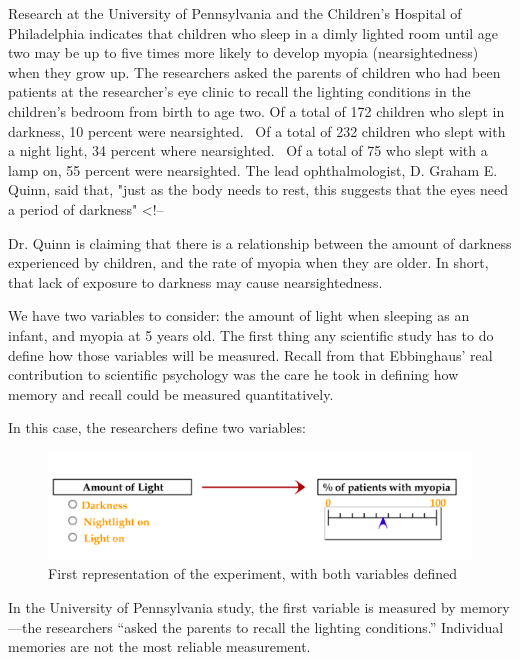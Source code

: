 \begin{refsection}
\begin{apatextbox}
Research at the University of Pennsylvania and the Children's Hospital of Philadelphia indicates that children who sleep in a dimly lighted room until age two may be up to five times more likely to develop myopia (nearsightedness) when they grow up.\newline
The researchers asked the parents of children who had been patients at the researcher's eye clinic to recall the lighting conditions in the children's bedroom from birth to age two.\newline
Of a total of 172 children who slept in darkness, 10 percent were nearsighted.  Of a total of 232 children who slept with a night light, 34 percent where nearsighted.  Of a total of 75 who slept with a lamp on, 55 percent were nearsighted.\newline
The lead ophthalmologist, D. Graham E. Quinn, said that, "just as the body needs to rest, this suggests that the eyes need a period of darkness" 
<!--\end{apatextbox}

Dr. Quinn is claiming that there is a relationship between the amount of darkness experienced by children, and the rate of myopia when they are older. In short, that lack of exposure to darkness may cause nearsightedness.

We have two variables to consider: the amount of light when sleeping as an infant, and myopia at 5 years old. The first thing any scientific study has to do define how those variables will be measured. Recall from  that Ebbinghaus' real contribution to scientific psychology was the care he took in defining how memory and recall could be measured quantitatively. 

In this case, the researchers define two variables:
\begin{figure}\includegraphics{../images/hypothesis2.png}\caption{First representation of the experiment, with both variables defined}\label{fig:hypothesis1}\end{figure}
 In the University of Pennsylvania study, the first variable is measured by memory---the researchers ``asked the parents to recall the lighting conditions.'' Individual memories are not the most reliable measurement. 


\end{refsection}
